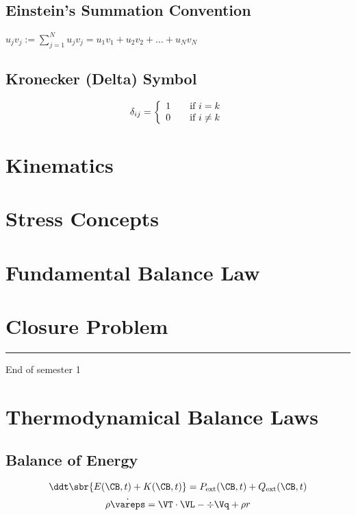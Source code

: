 \documentclass[a5paper,twosided,11pt,DIV=15,BCOR=0mm]{scrbook}
\newcommand{\veps}{\vareps}
\newcommand{\ext}{\ensuremath{\textup{ext}}}
\begin{document}
\section{Einstein's Summation Convention}
%
$u_jv_j := \sum\limits_{j=1}^N u_jv_j = u_1v_1 + u_2v_2 + \ldots + u_Nv_N$
%
\section{Kronecker (Delta) Symbol}
%
\begin{equation}
  \delta_{ij} = \left\{
    \begin{array}{l l}
      1 & \quad \text{if $i=k$}\\
      0 & \quad \text{if $i\neq k$}
    \end{array} \right.
\end{equation}
%
%
\chapter{Kinematics}
%
\chapter{Stress Concepts}
%
\chapter{Fundamental Balance Law}
%
\chapter{Closure Problem}
%
%
\rule{0.3\linewidth}{0.25pt}
End of semester 1
%
\chapter{Thermodynamical Balance Laws}
\section{Balance of Energy}
%
\begin{equation}
  \ddt \sbr{E(\CB,t)+K(\CB,t)} = P_{\ext}(\CB,t)+Q_{\ext}(\CB,t)
\end{equation}
\begin{equation}
 \rho\dot{\veps} = \VT\cdot\VL - \div \Vq + \rho r
\end{equation}
%
\end{document}
